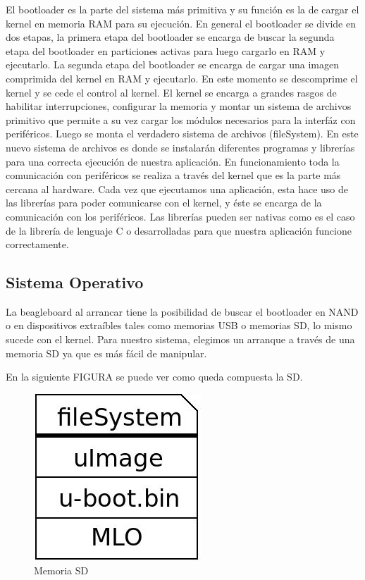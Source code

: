 El bootloader es la parte del sistema más primitiva y su función es la de cargar el kernel en memoria RAM para su ejecución. En general el bootloader se divide en dos etapas, la primera etapa del bootloader se encarga de buscar la segunda etapa del bootloader en particiones activas para luego cargarlo en RAM y ejecutarlo. La segunda etapa del bootloader se encarga de cargar una imagen comprimida del kernel en RAM y ejecutarlo. En este momento se descomprime el kernel y se cede el control al kernel.
El kernel se encarga a grandes rasgos de habilitar interrupciones, configurar la memoria y montar un sistema de archivos primitivo que permite a su vez cargar los módulos necesarios para la interfáz con periféricos. Luego se monta el verdadero sistema de archivos (fileSystem). En este nuevo sistema de archivos es donde se instalarán diferentes programas y librerías para una correcta ejecución de nuestra aplicación.
En funcionamiento toda la comunicación con periféricos se realiza a través del kernel que es la parte más cercana al hardware.
Cada vez que ejecutamos una aplicación, esta hace uso de las librerías para poder comunicarse con el kernel, y éste se encarga de la comunicación con los periféricos. Las librerías pueden ser nativas como es el caso de la librería de lenguaje C o desarrolladas para que nuestra aplicación funcione correctamente.


\subsection{Sistema Operativo}
La beagleboard al arrancar tiene la posibilidad de buscar el bootloader en NAND o en dispositivos extraíbles tales como memorias USB o memorias SD, lo mismo sucede con el kernel. Para nuestro sistema, elegimos un arranque a través de una memoria SD ya que es más fácil de manipular.

En la siguiente FIGURA se puede ver como queda compuesta la SD.

\begin{figure}[H]
\centering
  \begin{center}
  \includegraphics[scale=.4]{Imagenes/sd.jpg} 
  \end{center}
  \caption{Memoria SD}\label{Fig:HW} 
\end{figure}

